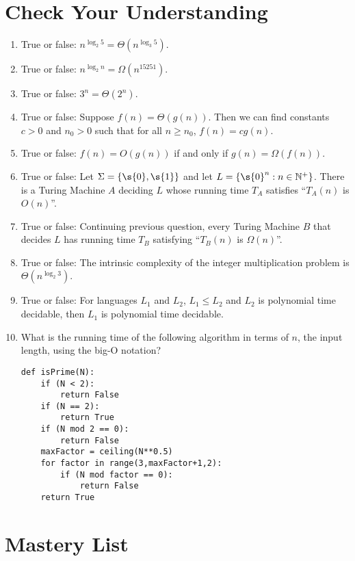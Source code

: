 \section{Check Your Understanding}
\label{sec:time-complexity::check-your-understanding}

\begin{gram}
\label{grm:time-complexity::true}
\begin{enumerate}
    \item True or false: $n^{\log_2 5} = \Theta(n^{\log_3 5})$.
    \item True or false: $n^{\log_2 n} = \Omega(n^{15251})$.
    \item True or false: $3^n = \Theta(2^n)$.
    \item True or false: Suppose $f(n) = \Theta(g(n))$. Then we can find constants $c > 0$ and $n_0 > 0$ such that for all $n \geq n_0$, $f(n) = cg(n)$.
    \item True or false: $f(n) = O(g(n))$ if and only if $g(n) = \Omega(f(n))$.
    \item True or false: Let $\Sigma = \{\s{0},\s{1}\}$ and let $L = \{\s{0}^n : n \in \mathbb{N}^+\}$. There is a Turing Machine $A$ deciding $L$ whose running time $T_A$ satisfies ``$T_A(n)$ is $O(n)$''.
    \item True or false: Continuing previous question, every Turing Machine $B$ that decides $L$ has running time $T_B$ satisfying ``$T_B(n)$ is $\Omega(n)$''.
    \item True or false: The intrinsic complexity of the integer multiplication problem is $\Theta(n^{\log_2 3})$.
    \item True or false: For languages $L_1$ and $L_2$, $L_1 \leq L_2$ and $L_2$ is polynomial time decidable, then $L_1$ is polynomial time decidable.
    \item What is the running time of the following algorithm in terms of $n$, the input length, using the big-O notation?
    \begin{verbatim}
def isPrime(N):
    if (N < 2):
        return False
    if (N == 2):
        return True
    if (N mod 2 == 0):
        return False
    maxFactor = ceiling(N**0.5)
    for factor in range(3,maxFactor+1,2):
        if (N mod factor == 0):
            return False
    return True
\end{verbatim}
\end{enumerate}

\end{gram}


\section{Mastery List}
\label{sec:time-complexity::mastery-list}

